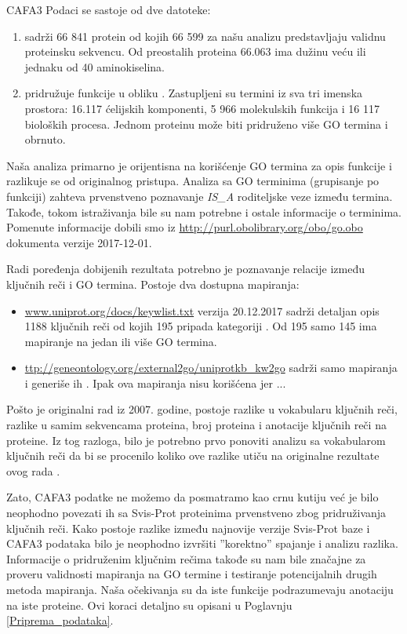 CAFA3 Podaci se sastoje od dve datoteke:
\begin{enumerate}
  \item {}  sadrži 66 841 protein od kojih 66 599
    za našu analizu predstavljaju validnu proteinsku sekvencu. Od preostalih
    proteina 66.063 ima dužinu veću ili jednaku od 40 aminokiselina.
  \item {} pridružuje funkcije u obliku 
    . Zastupljeni su termini iz sva tri imenska prostora:
    16.117 ćelijskih komponenti, 5 966 molekulskih funkcija i 16 117 bioloških
    procesa. Jednom proteinu može biti pridruženo više GO termina i obrnuto.
\end{enumerate}

Naša analiza primarno je orijentisna na korišćenje GO termina za opis funkcije
i razlikuje se od originalnog pristupa.  Analiza sa GO terminima (grupisanje po
funkciji) zahteva prvenstveno poznavanje \textit{IS\_A} roditeljske veze između
termina. Takođe, tokom istraživanja bile su nam potrebne i ostale informacije o
terminima. Pomenute informacije dobili smo iz
\url{http://purl.obolibrary.org/obo/go.obo} dokumenta verzije 2017-12-01.

Radi poređenja dobijenih rezultata potrebno je poznavanje relacije između
ključnih reči i GO termina. Postoje dva dostupna mapiranja:
\begin{itemize}
  \item \url{www.uniprot.org/docs/keywlist.txt} verzija 20.12.2017 sadrži
    detaljan opis 1188 ključnih reči od kojih 195 pripada kategoriji
    .  Od 195 samo 145 ima mapiranje na jedan ili
    više GO termina.
  \item \url{ttp://geneontology.org/external2go/uniprotkb_kw2go} sadrži samo
    mapiranja i generiše ih  \parencite{Barrell2009}.
    Ipak ova mapiranja nisu korišćena jer ... 
\end{itemize}

Pošto je originalni rad \parencite{Xie2007} iz 2007. godine, postoje razlike u
vokabularu ključnih reči, razlike u samim sekvencama proteina, broj proteina i
anotacije ključnih reči na proteine.  Iz tog razloga, bilo je potrebno
prvo ponoviti analizu sa vokabularom ključnih reči da bi se procenilo koliko
ove razlike utiču na originalne rezultate ovog rada \parencite{Xie2007}.

Zato, CAFA3 podatke ne možemo da posmatramo kao crnu kutiju već je
bilo neophodno povezati ih sa Svis-Prot proteinima prvenstveno zbog
pridruživanja ključnih reči. Kako postoje razlike između najnovije verzije Svis-Prot
baze i CAFA3 podataka bilo je neophodno izvršiti ''korektno'' spajanje i
analizu razlika.  Informacije o pridruženim ključnim rečima takođe su nam bile
značajne za proveru validnosti mapiranja na GO termine i testiranje
potencijalnih drugih metoda mapiranja. Naša očekivanja su da iste funkcije
podrazumevaju anotaciju na iste proteine.  Ovi koraci detaljno su opisani u
Poglavnju \ref{Priprema_podataka}.



